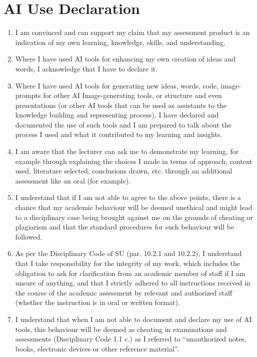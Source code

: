 \chapter*{AI Use Declaration}

{\setlength{}%
 \setlength{}%
 \setlength\itemindent{0pt}%
 \setlength{}%
 \setlength\topsep{0pt}%
 \setlength\partopsep{0pt}%
\begin{enumerate}
    \setlength\itemsep{\smallskipamount}%
    \setlength\parskip{0pt}%
    \small
    
    \item I am convinced and can support my claim that my assessment product is an indication of my own learning, knowledge, skills, and understanding.
    
    \item Where I have used AI tools for enhancing my own creation of ideas and words, I acknowledge that I have to declare it.
    
    \item Where I have used AI tools for generating new ideas, words, code, image-prompts for other AI Image-generating tools, or structure and even presentations (or other AI tools that can be used as assistants to the knowledge building and representing process), I have declared and documented the use of such tools and I am prepared to talk about the process I used and what it contributed to my learning and insights.
    
    \item I am aware that the lecturer can ask me to demonstrate my learning, for example through explaining the choices I made in terms of approach, content used, literature selected, conclusions drawn, etc. through an additional assessment like an oral (for example).
    
    \item I understand that if I am not able to agree to the above points, there is a chance that my academic behaviour will be deemed unethical and might lead to a disciplinary case being brought against me on the grounds of cheating or plagiarism and that the standard procedures for such behaviour will be followed.
    
    \item As per the Disciplinary Code of SU (par. 10.2.1 and 10.2.2), I understand that I take responsibility for the integrity of my work, which includes the obligation to ask for clarification from an academic member of staff if I am unsure of anything, and that I strictly adhered to all instructions received in the course of the academic assessment by relevant and authorized staff (whether the instruction is in oral or written format).
    
    \item I understand that when I am not able to document and declare my use of AI tools, this behaviour will be deemed as cheating in examinations and assessments (Disciplinary Code 1.1 c.) as I referred to “unauthorized notes, books, electronic devices or other reference material”.
\end{enumerate}}
\vspace{10mm}


